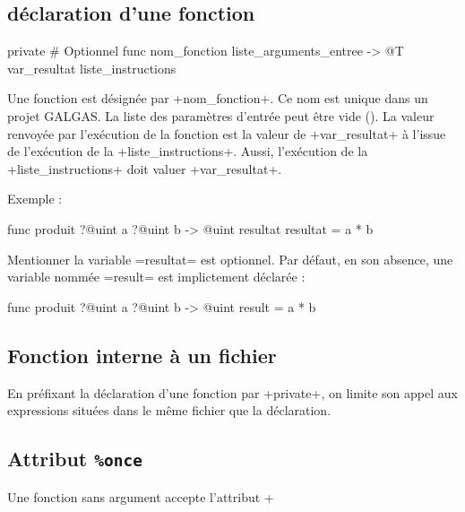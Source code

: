 \subsection{déclaration d'une fonction}

\begin{galgas3}
private # Optionnel
func nom_fonction liste_arguments_entree -> @T var_resultat {
  liste_instructions
}
\end{galgas3}

Une fonction est désignée par \ggst+nom_fonction+. Ce nom est unique dans un projet GALGAS. La liste des paramètres d'entrée peut être vide (). La valeur renvoyée par l'exécution de la fonction est la valeur de \ggst+var_resultat+ à l'issue de l'exécution de la \ggst+liste_instructions+. Aussi, l'exécution de la \ggst+liste_instructions+ doit valuer \ggst+var_resultat+.

Exemple :

\begin{galgas3}
func produit ?@uint a ?@uint b -> @uint resultat {
  resultat = a * b
}
\end{galgas3}

Mentionner la variable \ggst=resultat= est optionnel. Par défaut, en son absence, une variable nommée \ggst=result= est implictement déclarée :

\begin{galgas3}
func produit ?@uint a ?@uint b -> @uint {
  result = a * b
}
\end{galgas3}




\subsection{Fonction interne à un fichier}

En préfixant la déclaration d'une fonction par \ggst+private+, on limite son appel aux expressions situées dans le même fichier que la déclaration.




\subsection{Attribut \texttt{\%once}}

Une fonction sans argument accepte l'attribut \ggst+%


